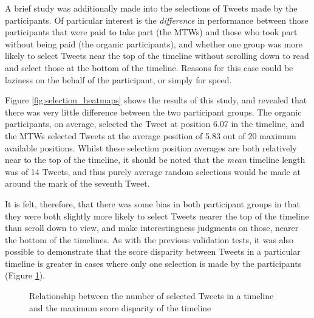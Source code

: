 A brief study was additionally made into the selections of Tweets made by the participants. Of particular interest is the \textit{difference} in performance between those participants that were paid to take part (the MTWs) and those who took part without being paid (the organic participants), and whether one group was more likely to select Tweets near the top of the timeline without scrolling down to read and select those at the bottom of the timeline. Reasons for this case could be laziness on the behalf of the participant, or simply for speed.

Figure \ref{fig:selection_heatmaps} shows the results of this study, and revealed that there was very little difference between the two participant groups. The organic participants, on average, selected the Tweet at position 6.07 in the timeline, and the MTWs selected Tweets at the average position of 5.83 out of 20 maximum available positions. Whilst these selection position averages are both relatively near to the top of the timeline, it should be noted that the \textit{mean} timeline length was of 14 Tweets, and thus purely average random selections would be made at around the mark of the seventh Tweet.

It is felt, therefore, that there was some bias in both participant groups in that they were both slightly more likely to select Tweets nearer the top of the timeline than scroll down to view, and make interestingness judgments on those, nearer the bottom of the timelines. As with the previous validation tests, it was also possible to demonstrate that the score disparity between Tweets in a particular timeline is greater in cases where only one selection is made by the participants (Figure \ref{fig:disparity2}). 

\begin{figure}
    \centering
\caption{Relationship between the number of selected Tweets in a timeline and the maximum score disparity of the timeline}
\label{fig:disparity2}
\end{figure}


